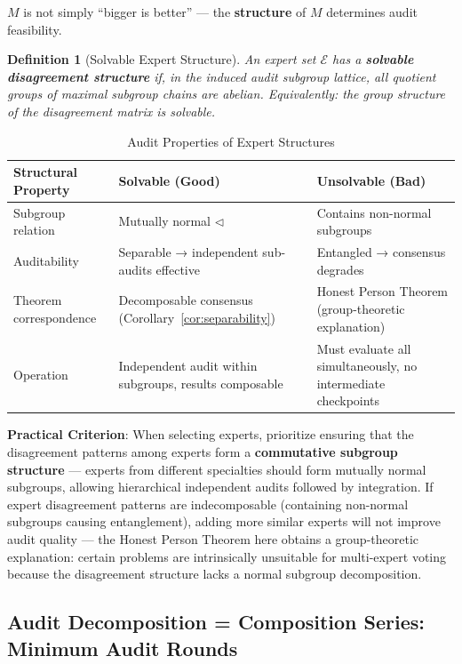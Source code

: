 \documentclass[10pt,a4paper]{article}
\newtheorem{definition}[theorem]{Definition}
\theoremstyle{remark}
\begin{document}
$M$ is not simply ``bigger is better'' --- the \textbf{structure} of $M$ determines audit feasibility.

\begin{definition}[Solvable Expert Structure]
An expert set $\mathcal{E}$ has a \textbf{solvable disagreement structure} if, in the induced audit subgroup lattice, all quotient groups of maximal subgroup chains are abelian. Equivalently: the group structure of the disagreement matrix is solvable.
\end{definition}

\begin{table}[h]
\centering
\caption{Audit Properties of Expert Structures}
\small
\begin{tabular}{@{}p{3.2cm} p{4.2cm} p{4.2cm}@{}}
\toprule
\textbf{Structural Property} & \textbf{Solvable (Good)} & \textbf{Unsolvable (Bad)} \\
\midrule
Subgroup relation & Mutually normal $\triangleleft$ & Contains non-normal subgroups \\
Auditability & Separable → independent sub-audits effective & Entangled → consensus degrades \\
Theorem correspondence & Decomposable consensus (Corollary~\ref{cor:separability}) & Honest Person Theorem (group-theoretic explanation) \\
Operation & Independent audit within subgroups, results composable & Must evaluate all simultaneously, no intermediate checkpoints \\
\bottomrule
\end{tabular}
\end{table}

\textbf{Practical Criterion}: When selecting experts, prioritize ensuring that the disagreement patterns among experts form a \textbf{commutative subgroup structure} --- experts from different specialties should form mutually normal subgroups, allowing hierarchical independent audits followed by integration. If expert disagreement patterns are indecomposable (containing non-normal subgroups causing entanglement), adding more similar experts will not improve audit quality --- the Honest Person Theorem here obtains a group-theoretic explanation: certain problems are intrinsically unsuitable for multi-expert voting because the disagreement structure lacks a normal subgroup decomposition.

\subsection{Audit Decomposition = Composition Series: Minimum Audit Rounds}
\end{document}
